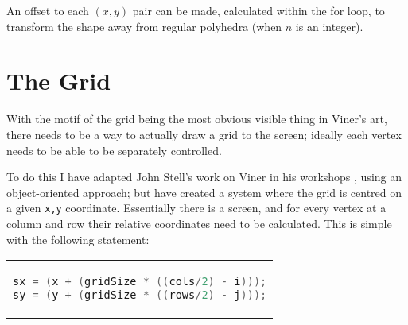 An offset to each $(x,y)$ pair can be made, calculated within the for loop, to
transform the shape away from regular polyhedra (when $n$ is an integer).

\section{The Grid}
With the motif of the grid being the most obvious visible thing in Viner's art,
there needs to be a way to actually draw a grid to the screen; ideally each
vertex needs to be able to be separately controlled.

To do this I have adapted John Stell's work on Viner in his workshops
\cite{stell_unpublished}, using an object-oriented approach; but have created a
system where the grid is centred on a given \verb|x,y| coordinate. Essentially
there is a screen, and for every vertex at a column and row their relative
coordinates need to be calculated. This is simple with the following statement:



%
%

%

\begin{center}
\begin{tabular}{c}
\begin{lstlisting}[language=java]
sx = (x + (gridSize * ((cols/2) - i)));
sy = (y + (gridSize * ((rows/2) - j)));
\end{lstlisting}
\end{tabular}
\end{center}

